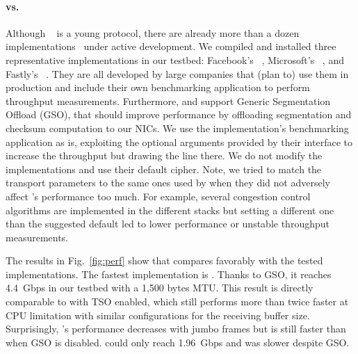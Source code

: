 \paragraph{\tcpls vs. \quic}
Although \quic~\cite{draft-ietf-quic-transport} is a young protocol, there are
already more than a dozen
implementations~\cite{marx2020same,quicimplem,yang2020making} under active
development. We compiled and installed three representative \quic
implementations in our testbed: Facebook's
\mvfst~\cite{mvfst-github,Joras_mvfst}, Microsoft's
\msquic~\cite{msquic-github}, and Fastly's \quicly~\cite{quicly-github}. They
are all developed by large companies that (plan to) use them in production and
include their own benchmarking application to perform throughput measurements.
Furthermore, \mvfst and \quicly support Generic Segmentation Offload (GSO), that
should improve performance by offloading \udp segmentation and checksum
computation to our NICs. We use the implementation's benchmarking application as
is, exploiting the optional arguments provided by their interface to increase
the throughput but drawing the line there. We do not modify the \quic
implementations and use their default cipher. Note, we tried to match the
transport parameters to the same ones used by \tcpls when they did not adversely
affect \quic's performance too much. For example, several congestion control
algorithms are implemented in the different \quic stacks but setting a different
one than the suggested default led to lower performance or unstable throughput
measurements.

The results in Fig.~\ref{fig:perf} show that \tcpls compares favorably
with the tested \quic implementations. The fastest \quic implementation is
\quicly. Thanks to GSO, it reaches 4.4~Gbps in our testbed with a 1,500 bytes
MTU. This result is directly comparable to \tcpls with TSO enabled, which still
performs more than twice faster at CPU limitation with similar configurations
for the receiving buffer size. Surprisingly, \quicly's performance decreases with
jumbo frames but is still faster than when GSO is disabled.
\msquic could only reach 1.96~Gbps and \mvfst was slower despite GSO.





